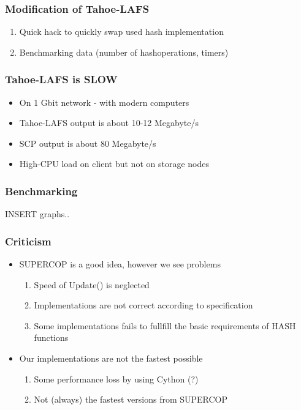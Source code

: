 \documentclass[screen]{beamer}
\begin{document}
\begin{frame}
  \frametitle{Modification of Tahoe-LAFS}
  \begin{enumerate}
  \item Quick hack to quickly swap used hash implementation
  \item Benchmarking data (number of hashoperations, timers)
  \end{enumerate}
\end{frame}

\begin{frame}
    \frametitle{Tahoe-LAFS is SLOW}
    \begin{itemize}
        \item On 1 Gbit network - with modern computers
        \item Tahoe-LAFS output is about 10-12 Megabyte/s
        \item SCP output is about 80 Megabyte/s
        \item High-CPU load on client but not on storage nodes
    \end{itemize}
\end{frame}

\begin{frame}
    \frametitle{Benchmarking}
    
    INSERT graphs.. %
\end{frame}

\begin{frame}
    \frametitle{Criticism}
    \begin{itemize}
        \item SUPERCOP is a good idea, however we see problems
            \begin{enumerate}
                \item Speed of Update() is neglected
                \item Implementations are not correct according to specification
                \item Some implementations fails to fullfill the basic requirements
                of HASH functions
            \end{enumerate}
        \item Our implementations are not the fastest possible
            \begin{enumerate}
                \item Some performance loss by using Cython (?)
                \item Not (always) the fastest versions from SUPERCOP
            \end{enumerate}
    \end{itemize}
\end{frame}
\end{document}
